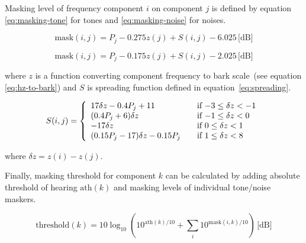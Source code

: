 Masking level of frequency component $i$ on component $j$ is defined by equation \ref{eq:masking-tone} for tones and \ref{eq:masking-noise} for noises.

\begin{equation}
\textrm{mask}(i, j) = P_{j} - 0.275 z(j) + S(i, j) - 6.025\,\textrm{[dB]}
\label{eq:masking-tone}
\end{equation}

\begin{equation}
\textrm{mask}(i, j) = P_{j} - 0.175 z(j) + S(i, j) - 2.025\,\textrm{[dB]}
\label{eq:masking-noise}
\end{equation}

where $z$ is a function converting component frequency to bark scale~(see equation \ref{eq:hz-to-bark}) and $S$ is spreading function defined in equation~\ref{eq:spreading}.

\begin{equation}
S(i, j) = \left\{
  \begin{array}{l l}
  17 \delta z -0.4 P_{j} + 11 & \quad \textrm{if $-3 \leq \delta z < -1$}\\
  (0.4P_{j} + 6) \delta z & \quad \textrm{if $-1 \leq \delta z < 0$}\\
  -17 \delta z & \quad \textrm{if $0 \leq \delta z < 1$}\\
  (0.15 P_{j} -17) \delta z - 0.15 P_{j} & \quad \textrm{if $1 \leq \delta z < 8$}
  \end{array}
\right.
\label{eq:spreading}
\end{equation}

where $\delta z = z(i) - z(j)$.


Finally, masking threshold for component $k$ can be calculated by adding absolute threshold of hearing $\textrm{ath}(k)$ and masking levels of individual tone/noise maskers.

\begin{equation}
\textrm{threshold}(k) = 10\log_{10}(10^{\textrm{ath}(k)/10} + \sum_{i} 10^{\textrm{mask}(i, k)/10} )\,\textrm{[dB]}
\end{equation}

